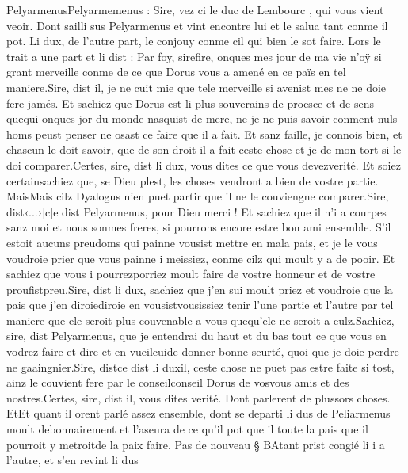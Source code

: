 \documentclass{article}
\begin{document}
\begin{pages}
      PelyarmenusPelyarmemenus :
   Sire, vez ci le duc de Lembourc
      , qui vous vient veoir.
   Dont sailli sus Pelyarmenus et vint encontre lui et le salua 
   tant conme il pot. 
   Li dux, de l’autre part, le conjouy conme cil qui bien le sot faire. 
   Lors le trait a une part et li dist :
   Par foy, sirefire, 
      onques mes jour de ma vie n’oÿ si 
      grant merveille conme de ce que Dorus vous a amené en ce païs en tel maniere.Sire, dist il, je ne cuit mie que tele merveille si avenist mes ne ne doie fere jamés. 
   Et sachiez que Dorus est li plus souverains de proesce 
      et de sens quequi onques jor du monde nasquist de mere, 
      ne je ne puis savoir conment nuls homs peust penser ne osast ce faire que il a fait. Et sanz faille, je connois bien, 
   et chascun le doit savoir, que de son droit il a fait ceste chose et je de mon tort si le doi comparer.Certes, sire, dist 
   li dux, vous dites ce que vous devezverité. 
      Et soiez certainsachiez que, se Dieu plest, 
      les choses vendront a bien de vostre partie. 
      MaisMais cilz Dyalogus 
      n’en puet partir que il ne le couviengne comparer.Sire, dist‹...›[c]e dist
      Pelyarmenus, pour Dieu merci ! 
   Et sachiez que il n’i a courpes sanz moi et nous sonmes freres, si pourrons encore estre bon ami ensemble.  
      S’il estoit aucuns preudoms qui painne vousist mettre en mala pais, 
      et je le vous voudroie prier que vous painne
   i meissiez, conme cilz qui moult y a de pooir. Et sachiez que vous i pourrezporriez
      moult faire de vostre honneur et de vostre proufistpreu.Sire, dist li dux, sachiez que j’en sui moult priez 
      et voudroie que la pais que j’en diroiediroie en 
      vousistvousissiez tenir l’une partie 
      et l’autre par tel maniere que ele seroit plus couvenable a vous 
      quequ'ele ne seroit a eulz.Sachiez, sire, dist Pelyarmenus, 
      que je entendrai du haut et du bas tout ce que vous en vodrez faire et dire 
      et en vueilcuide 
      donner bonne seurté, quoi que je doie perdre ne gaaingnier.Sire, distce dist 
      li duxil, 
      ceste chose ne puet pas estre faite si tost, ainz le couvient fere par le 
      conseilconseil Dorus de 
      vosvous amis et des nostres.Certes, sire, dist il, vous dites verité. 
   Dont parlerent de plussors choses. 
   EtEt quant il orent parlé assez ensemble, dont se departi 
   li dus de Peliarmenus moult debonnairement et 
   l’aseura de ce qu’il pot 
   que il toute la pais que il pourroit y metroitde la paix faire. \pend
\pstart Pas de nouveau § BAtant prist congié li i a l’autre, 
   et s’en revint li dus

\end{pages}
\end{document}
